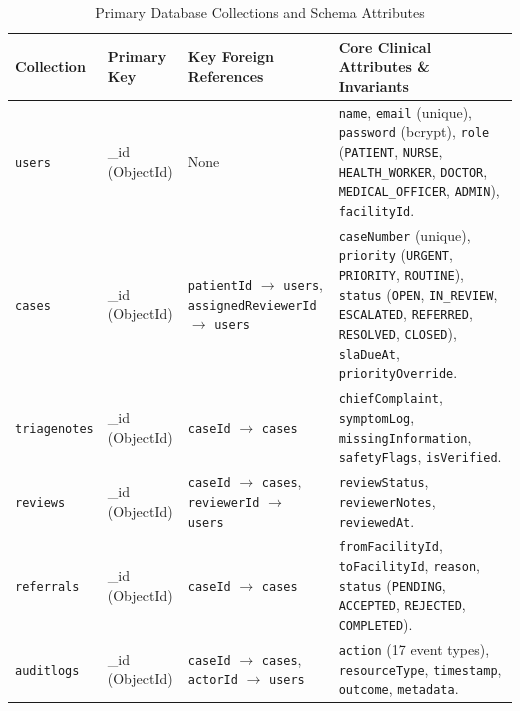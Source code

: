 \documentclass[11pt,a4paper,oneside]{report}
\begin{document}
\begin{table}[htbp]
  \centering
  \small
  \caption{Primary Database Collections and Schema Attributes}
  \label{tab:db_collections}
  \begin{tabularx}{\textwidth}{lp{2.4cm}p{2.8cm}X}
    \toprule
    \textbf{Collection} & \textbf{Primary Key} & \textbf{Key Foreign References} & \textbf{Core Clinical Attributes \& Invariants} \\
    \midrule
    \texttt{users} & \_id (ObjectId) & None & \texttt{name}, \texttt{email} (unique), \texttt{password} (bcrypt), \texttt{role} (\texttt{PATIENT}, \texttt{NURSE}, \texttt{HEALTH\_WORKER}, \texttt{DOCTOR}, \texttt{MEDICAL\_OFFICER}, \texttt{ADMIN}), \texttt{facilityId}. \\
    \addlinespace
    \texttt{cases} & \_id (ObjectId) & \texttt{patientId} $\to$ \texttt{users}, \texttt{assignedReviewerId} $\to$ \texttt{users} & \texttt{caseNumber} (unique), \texttt{priority} (\texttt{URGENT}, \texttt{PRIORITY}, \texttt{ROUTINE}), \texttt{status} (\texttt{OPEN}, \texttt{IN\_REVIEW}, \texttt{ESCALATED}, \texttt{REFERRED}, \texttt{RESOLVED}, \texttt{CLOSED}), \texttt{slaDueAt}, \texttt{priorityOverride}. \\
    \addlinespace
    \texttt{triagenotes} & \_id (ObjectId) & \texttt{caseId} $\to$ \texttt{cases} & \texttt{chiefComplaint}, \texttt{symptomLog}, \texttt{missingInformation}, \texttt{safetyFlags}, \texttt{isVerified}. \\
    \addlinespace
    \texttt{reviews} & \_id (ObjectId) & \texttt{caseId} $\to$ \texttt{cases}, \texttt{reviewerId} $\to$ \texttt{users} & \texttt{reviewStatus}, \texttt{reviewerNotes}, \texttt{reviewedAt}. \\
    \addlinespace
    \texttt{referrals} & \_id (ObjectId) & \texttt{caseId} $\to$ \texttt{cases} & \texttt{fromFacilityId}, \texttt{toFacilityId}, \texttt{reason}, \texttt{status} (\texttt{PENDING}, \texttt{ACCEPTED}, \texttt{REJECTED}, \texttt{COMPLETED}). \\
    \addlinespace
    \texttt{auditlogs} & \_id (ObjectId) & \texttt{caseId} $\to$ \texttt{cases}, \texttt{actorId} $\to$ \texttt{users} & \texttt{action} (17 event types), \texttt{resourceType}, \texttt{timestamp}, \texttt{outcome}, \texttt{metadata}. \\
    \bottomrule
  \end{tabularx}
\end{table}
\end{document}
